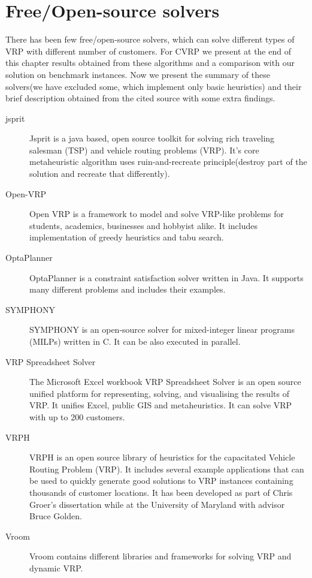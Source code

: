 \documentclass[thesis=B,english]{FITthesis}[2012/10/20]
\begin{document}
    \section{Free/Open-source solvers}
    There has been few free/open-source solvers, which can solve different types of VRP with different number of customers. For CVRP we present at the end of this chapter results obtained from these algorithms and a comparison with our solution on benchmark instances. Now we present the summary of these solvers(we have excluded some, which implement only basic heuristics) and their brief description obtained from the cited source with some extra findings.
    \begin{description}
      \item[jsprit\cite{8}]Jsprit is a java based, open source toolkit for solving rich traveling salesman (TSP) and vehicle routing problems (VRP). It's core metaheuristic algorithm uses ruin-and-recreate principle(destroy part of the solution and recreate that differently).
      \item[Open-VRP\cite{9}]Open VRP is a framework to model and solve VRP-like problems for students, academics, businesses and hobbyist alike. It includes implementation of greedy heuristics and tabu search.
      \item[OptaPlanner\cite{10}]OptaPlanner is a constraint satisfaction solver written in Java. It supports many different problems and includes their examples.
      \item[SYMPHONY\cite{11}]SYMPHONY is an open-source solver for mixed-integer linear programs (MILPs) written in C. It can be also executed in parallel.
      \item[VRP Spreadsheet Solver\cite{12}]The Microsoft Excel workbook VRP Spreadsheet Solver is an open source unified platform for representing, solving, and visualising the results of VRP. It unifies Excel, public GIS and metaheuristics. It can solve VRP with up to 200 customers.
      \item[VRPH\cite{13}]VRPH is an open source library of heuristics for the capacitated Vehicle Routing Problem (VRP). It includes several example applications that can be used to quickly generate good solutions to VRP instances containing thousands of customer locations. It has been developed as part of Chris Groer's dissertation while at the University of Maryland with advisor Bruce Golden.
      \item[Vroom\cite{14}]Vroom contains different libraries and frameworks for solving VRP and dynamic VRP.
    \end{description}
\end{document}
